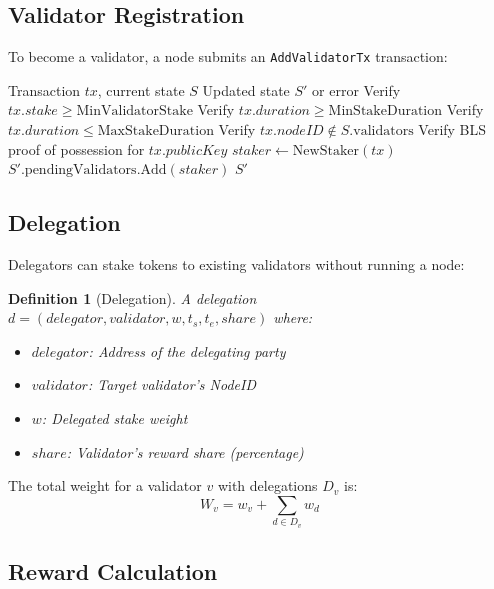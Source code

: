 \documentclass[11pt,letterpaper]{article}
\newtheorem{definition}{Definition}
\begin{document}
\subsection{Validator Registration}

To become a validator, a node submits an \texttt{AddValidatorTx} transaction:

\begin{algorithm}
\caption{Validator Registration}
\label{alg:registration}
\begin{algorithmic}[1]
\Require Transaction $tx$, current state $S$
\Ensure Updated state $S'$ or error
\State Verify $tx.stake \geq \text{MinValidatorStake}$
\State Verify $tx.duration \geq \text{MinStakeDuration}$
\State Verify $tx.duration \leq \text{MaxStakeDuration}$
\State Verify $tx.nodeID \notin S.\text{validators}$
\State Verify BLS proof of possession for $tx.publicKey$
\State $staker \gets \text{NewStaker}(tx)$
\State $S'.\text{pendingValidators}.\text{Add}(staker)$
\State \Return $S'$
\end{algorithmic}
\end{algorithm}

\subsection{Delegation}

Delegators can stake tokens to existing validators without running a node:

\begin{definition}[Delegation]
A delegation $d = (delegator, validator, w, t_s, t_e, share)$ where:
\begin{itemize}
    \item $delegator$: Address of the delegating party
    \item $validator$: Target validator's NodeID
    \item $w$: Delegated stake weight
    \item $share$: Validator's reward share (percentage)
\end{itemize}
\end{definition}

The total weight for a validator $v$ with delegations $D_v$ is:
\begin{equation}
W_v = w_v + \sum_{d \in D_v} w_d
\end{equation}

\subsection{Reward Calculation}
\end{document}
